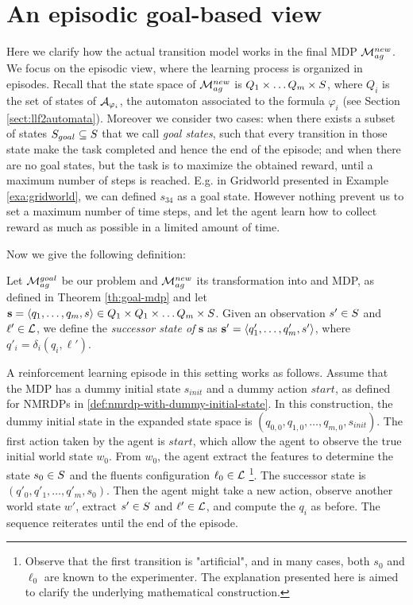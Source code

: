 \section{An episodic goal-based view}
Here we clarify how the actual transition model works in the final MDP $\mathcal{M}_{ag}^{new}$. We focus on the episodic view, where the learning process is organized in episodes.
Recall that the state space of $\mathcal{M}_{ag}^{new}$ is $Q_1\times \dots Q_m \times S$, where $Q_i$ is the set of states of $\mathcal{A}_{\varphi_i}$, the automaton associated to the \LLf formula $\varphi_i$ (see Section \ref{sect:llf2automata}). 
Moreover we consider two cases: when there exists a subset of states $S_{goal} \subseteq S$ that we call \emph{goal states}, such that every transition in those state make the task completed and hence the end of the episode; and when there are no goal states, but the task is to maximize the obtained reward, until a maximum number of steps is reached. E.g. in Gridworld presented in Example \ref{exa:gridworld}, we can defined $s_{34}$ as a goal state. However nothing prevent us to set a maximum number of time steps, and let the agent learn how to collect reward as much as possible in a limited amount of time.

Now we give the following definition:
\begin{definition}
	Let $\mathcal{M}_{ag}^{goal}$ be our problem and $\mathcal{M}_{ag}^{new}$ its transformation into and MDP, as defined in Theorem \ref{th:goal-mdp} and let $\mathbf{s}=\langle q_1, \dots, q_m, s \rangle\in Q_1\times Q_1\times \dots Q_m \times S$. Given an observation $s'\in S$ and $\ell'\in\mathcal{L}$, we define the \emph{successor state of} $\mathbf{s}$ as $\mathbf{s'}=\langle q'_1, \dots, q'_m, s' \rangle$, where $q'_i = \delta_i(q_i, \ell')$.
\end{definition}
	
A reinforcement learning episode in this setting works as follows. Assume that the MDP has a dummy initial state $s_{init}$ and a dummy action $start$, as defined for NMRDPs in \ref{def:nmrdp-with-dummy-initial-state}. In this construction, the dummy initial state in the expanded state space is $(q_{0,0}, q_{1,0}, \dots, q_{m, 0}, s_{init})$. 
The first action taken by the agent is $start$, which allow the agent to observe the true initial world state $w_0$. 
From $w_0$, the agent extract the features to determine the state $s_0\in S$ and the fluents configuration $\ell_0\in \mathcal{L}$
\footnote{Observe that the first transition is "artificial", and in many cases, both $s_0$ and $\ell_0$ are known to the experimenter. The explanation presented here is aimed to clarify the underlying mathematical construction.}. The successor state is $(q'_{0}, q'_{1}, \dots, q'_{m}, s_0)$. Then the agent might take a new action, observe another world state $w'$, extract $s'\in S$ and $\ell'\in\mathcal{L}$, and compute the $q_i$ as before. The sequence reiterates until the end of the episode.

